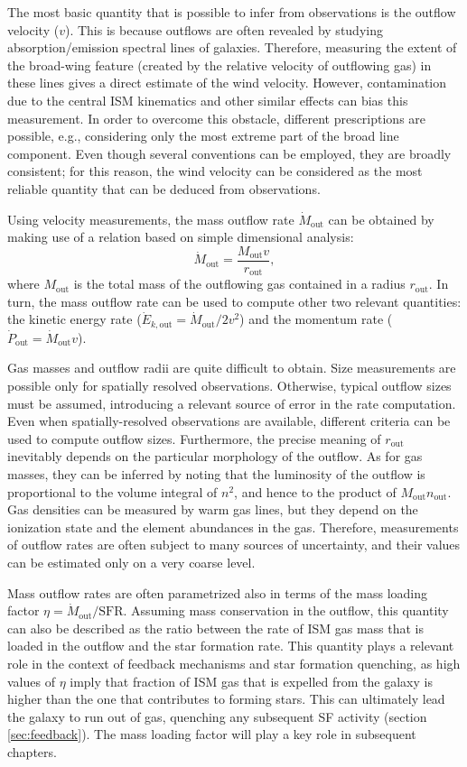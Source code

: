 The most basic quantity that is possible to infer from observations is the outflow velocity ($v$). This is because outflows are often revealed by studying absorption/emission spectral lines of galaxies. Therefore, measuring the extent of the broad-wing feature (created by the relative velocity of outflowing gas) in these lines gives a direct estimate of the wind velocity. However, contamination due to the central ISM kinematics and other similar effects can bias this measurement. In order to overcome this obstacle, different prescriptions are possible, e.g., considering only the most extreme part of the broad line component. Even though several conventions can be employed, they are broadly consistent; for this reason, the wind velocity can be considered as the most reliable quantity that can be deduced from observations. 

 
Using velocity measurements, the mass outflow rate $\dot{M}_\mathrm{out}$ can be obtained by making use of a relation based on simple dimensional analysis:
\begin{equation}
        \dot{M}_\mathrm{out} = \frac{M_\mathrm{out}v}{r_\mathrm{out}},
\end{equation}
where $M_\mathrm{out}$ is the total mass of the outflowing gas contained in a radius $r_\mathrm{out}$. In turn, the mass outflow rate can be used to compute other two relevant quantities: the kinetic energy rate ($\dot{E}_{k,\mathrm{out}} = \dot{M}_\mathrm{out}/2v^2$) and the momentum rate ($\dot{P}_\mathrm{out} = \dot{M}_\mathrm{out}v$).

Gas masses and outflow radii are quite difficult to obtain. Size measurements are possible only for spatially resolved observations. Otherwise, typical outflow sizes must be assumed, introducing a relevant source of error in the rate computation. Even when spatially-resolved observations are available, different criteria can be used to compute outflow sizes. Furthermore, the precise meaning of $r_\mathrm{out}$ inevitably depends on the particular morphology of the outflow. As for gas masses, they can be inferred by noting that the luminosity of the outflow is proportional to the volume integral of $n^2$, and hence to the product of $M_\mathrm{out}n_\mathrm{out}$. Gas densities can be measured by warm gas lines, but they depend on the ionization state and the element abundances in the gas. Therefore, measurements of outflow rates are often subject to many sources of uncertainty, and their values can be estimated only on a very coarse level.

Mass outflow rates are often parametrized also in terms of the mass loading factor $\eta = \dot{M}_\mathrm{out}/\mathrm{SFR}$. Assuming mass conservation in the outflow, this quantity can also be described as the ratio between the rate of ISM gas mass that is loaded in the outflow and the star formation rate. This quantity plays a relevant role in the context of feedback mechanisms and star formation quenching, as high values of $\eta$ imply that fraction of ISM gas that is expelled from the galaxy is higher than the one that contributes to forming stars. This can ultimately lead the galaxy to run out of gas, quenching any subsequent SF activity (section \ref{sec:feedback}). The mass loading factor will play a key role in subsequent chapters.

